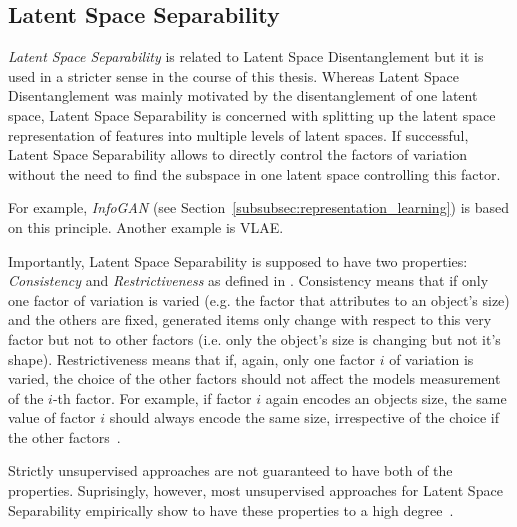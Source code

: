 \subsection{Latent Space Separability}\label{subsec:feature-separability}

\textit{Latent Space Separability} is related to Latent Space Disentanglement but it is used in a stricter sense in the course of this thesis.
Whereas Latent Space Disentanglement was mainly motivated by the disentanglement of one latent space, Latent Space Separability is concerned with splitting up the latent space representation of features into multiple levels of latent spaces.
If successful, Latent Space Separability allows to directly control the factors of variation without the need to find the subspace in one latent space controlling this factor.

For example, \textit{InfoGAN} (see Section~\ref{subsubsec:representation_learning}) is based on this principle.
Another example is \ac{VLAE}.

Importantly, Latent Space Separability is supposed to have two properties: \textit{Consistency} and \textit{Restrictiveness} as defined in \citet{Shu2020Weakly}.
Consistency means that if only one factor of variation is varied (e.g. the factor that attributes to an object's size) and the others are fixed, generated items only change with respect to this very factor but not to other factors (i.e. only the object's size is changing but not it's shape).
Restrictiveness means that if, again, only one factor $i$ of variation is varied, the choice of the other factors should not affect the models measurement of the $i$-th factor.
For example, if factor $i$ again encodes an objects size, the same value of factor $i$ should always encode the same size, irrespective of the choice if the other factors~\citep{Shu2020Weakly}.

Strictly unsupervised approaches are not guaranteed to have both of the properties.
Suprisingly, however, most unsupervised approaches for Latent Space Separability empirically show to have these properties to a high degree~\citep{Shu2020Weakly}.

